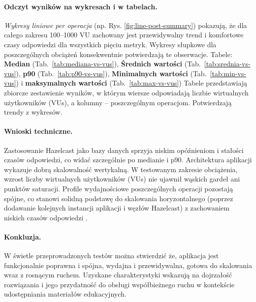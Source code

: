 \paragraph{Odczyt wyników na wykresach i w tabelach.}
\emph{Wykresy liniowe per operacja} (np. Rys. \ref{fig:line-post-summary}) pokazują,
że dla całego zakresu 100--1000 VU zachowany jest przewidywalny trend i komfortowe czasy odpowiedzi
dla wszystkich pięciu metryk. Wykresy słupkowe dla poszczególnych obciążeń
konsekwentnie potwierdzają te obserwacje. Tabele:
\textbf{Median} (Tab.~\ref{tab:mediana-vs-vus}),
\textbf{Średnich wartości} (Tab.~\ref{tab:srednia-vs-vus}),
\textbf{p90} (Tab.~\ref{tab:p90-vs-vus}),
\textbf{Minimalnych wartości} (Tab.~\ref{tab:min-vs-vus}) i
\textbf{maksymalnych wartości} (Tab.~\ref{tab:max-vs-vus})
Tabele przedstawiają zbiorcze zestawienie wyników, w którym wiersze odpowiadają liczbie wirtualnych użytkowników (VUs), a kolumny – poszczególnym operacjom. Potwierdzają trendy z wykresów.

\paragraph{Wnioski techniczne.}
Zastosowanie Hazelcast jako bazy danych sprzyja niskim opóźnieniom i stałości czasów odpowiedzi,
co widać szczególnie po medianie i p90. Architektura aplikacji wykazuje dobrą skalowalność wertykalną. W testowanym zakresie obciążenia, wzrost liczby wirtualnych użytkowników (VUs) nie ujawnił wąskich gardeł ani punktów saturacji. Profile wydajnościowe poszczególnych operacji pozostają spójne, co stanowi solidną podstawę do skalowania horyzontalnego (poprzez dodawanie kolejnych instancji aplikacji i węzłów Hazelcast) z zachowaniem niskich czasów odpowiedzi \cite{microservices}.

\paragraph{Konkluzja.}
W świetle przeprowadzonych testów można stwierdzić że,
aplikacja jest funkcjonalnie poprawna i spójna,
wydajna i przewidywalna,
gotowa do skalowania wraz z rosnącym ruchem.
Uzyskane charakterystyki wskazują na dojrzałość rozwiązania i jego przydatność do obsługi
współbieżnego ruchu w kontekście udostępniania materiałów edukacyjnych.